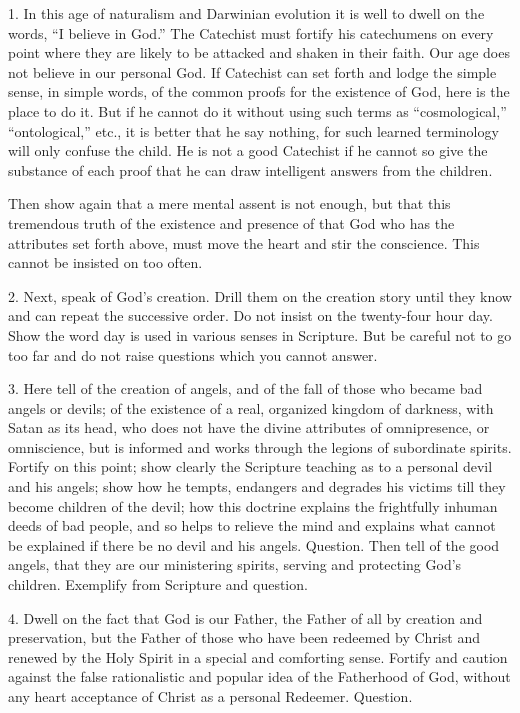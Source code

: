  1. In this age of naturalism and Darwinian evolution it is well to dwell on the words, “I believe in God.” The Catechist must fortify his catechumens on every point where they are likely to be attacked and shaken in their faith. Our age does not believe in our personal God. If Catechist can set forth and lodge the simple sense, in simple words, of the common proofs for the existence of God, here is the place to do it. But if he cannot do it without using such terms as “cosmological,” “ontological,” etc., it is better that he say nothing, for such learned terminology will only confuse the child. He is not a
good Catechist if he cannot so give the substance of each proof that he can draw intelligent answers from the children.

Then show again that a mere mental assent is not enough, but that this tremendous truth of the existence and presence of that God who has the attributes set forth above, must move the heart and stir the conscience. This cannot be insisted on too often.

 2. Next, speak of God’s creation. Drill them on the creation story until they know and can repeat the successive order. Do not insist on the twenty-four hour day. Show the word day is used in various senses in Scripture. But be careful not to go too far and do not raise questions which you cannot answer.

3. Here tell of the creation of angels, and of the fall of those who became bad angels or devils; of the existence of a real, organized kingdom of darkness, with Satan as its head, who does not have the divine attributes of omnipresence, or omniscience, but is informed and works through the legions of subordinate spirits. Fortify on this point; show clearly the Scripture teaching as to a personal devil and his angels; show how he tempts, endangers and degrades his victims till they become children of the devil; how this doctrine explains the frightfully inhuman deeds of bad people, and so helps to relieve the mind and explains what cannot be explained if
there be no devil and his angels. Question. Then tell of the good angels, that they are our ministering spirits, serving and protecting God’s children. Exemplify from Scripture and question.

 4. Dwell on the fact that God is our Father, the Father of all by creation and preservation, but the Father of those who have been redeemed by Christ and renewed by the Holy Spirit in a special and comforting sense. Fortify and caution against the false rationalistic and popular idea of the Fatherhood of God, without any heart acceptance of Christ as a personal Redeemer. Question.

